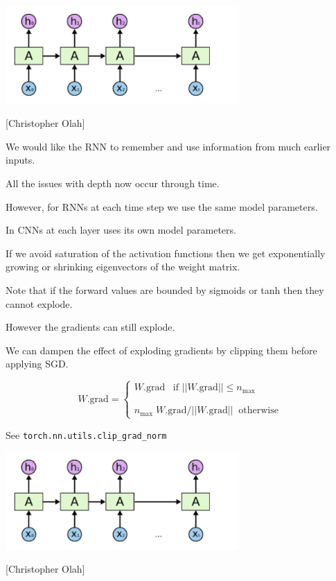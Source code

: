 {

\centerline{\includegraphics[width=3.5in]{../images/RNN}}
\centerline{{\large [Christopher Olah]}}

\vfill
We would like the RNN to {\color{red} remember and use} information from much earlier inputs.


\vfill
All the issues with depth now occur through time.

\vfill
However, for RNNs {\color{red} at each time step we use the same model parameters.}

\vfill
In CNNs {\color{red} at each layer uses its own model parameters.}


\vfill
If we avoid saturation of the activation functions then we get exponentially growing or shrinking eigenvectors of the weight matrix.

\vfill
Note that if the forward values are bounded by sigmoids or tanh then they cannot explode.

\vfill
However the gradients can still explode.


\vfill
We can dampen the effect of exploding gradients by clipping them before applying SGD.

\vfill
$$W.\mathrm{grad} = \left\{\begin{array}{l} W.\mathrm{grad} \;\;\;\mbox{if $||W.\mathrm{grad}|| \leq n_{\mathrm{max}}$} \\
                                                      \\ \\
                                                      n_{\mathrm{max}} \; W.\mathrm{grad} / ||W.\mathrm{grad}|| \;\; \mbox{otherwise}
\end{array} \right.$$

\vfill
See {\tt torch.nn.utils.clip\_grad\_norm}


\centerline{\includegraphics[width=3.5in]{../images/RNN}}
\centerline{{\large [Christopher Olah]}}

}
